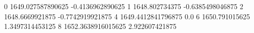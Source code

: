0 1649.027587890625 -0.4136962890625
1 1648.802734375 -0.6385498046875
2 1648.6669921875 -0.7742919921875
4 1649.4412841796875 0.0
6 1650.791015625 1.3497314453125
8 1652.3638916015625 2.922607421875
